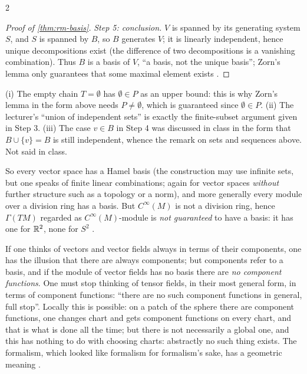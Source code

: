 \begin{paracol}{2}
\begin{proof}[Proof of \cref{thm:rm-basis}]
\emph{Step 5: conclusion.} $V$ is spanned by its generating system $S$, and $S$ is spanned by $B$, so $B$ generates $V$; it is linearly independent, hence unique decompositions exist (the difference of two decompositions is a vanishing combination). Thus $B$ is a basis of $V$, ``a basis, not the unique basis''; Zorn's lemma only guarantees that some maximal element exists
  .
\end{proof}
\begin{coursenote}
(i) The empty chain $T=\emptyset$ has $\emptyset\in P$ as an upper bound: this is why Zorn's lemma in the form above needs $P\ne\emptyset$, which is guaranteed since $\emptyset\in P$. (ii) The lecturer's ``union of independent sets'' is exactly the finite-subset argument given in Step 3. (iii) The case $v\in B$ in Step 4 was discussed in class in
the form that $B\cup\{v\}=B$ is still independent, whence the remark on sets and sequences above. Not said in class. 
\end{coursenote}
So every vector space has a Hamel basis (the construction may use infinite sets, but one speaks of finite linear combinations; again for vector spaces \emph{without} further structure such as a topology or a norm), and more generally every module over a division ring has a basis. But $C^\infty(M)$ is not a division ring, hence $\Gamma(TM)$ regarded as $C^\infty(M)$-module is
\emph{not guaranteed} to have a basis: it has one for $\mathbb{R}^2$, none for $S^2$     .

\begin{intuition}\label{int:rm-nocomp}
If one thinks of vectors and vector fields always in terms of their components, one has the illusion that there are always components; but components refer to a basis, and if the module of vector fields has no basis there are \emph{no component functions}. One must stop thinking of tensor fields, in their most general form, in terms of component functions: ``there
are no such component functions in general, full stop''. Locally this is possible: on a patch of the sphere there are component functions, one changes chart and gets component functions on every chart, and that is what is done all the time; but there is not necessarily a global one, and this has nothing to do with choosing charts: abstractly no such thing exists. The formalism, which looked like formalism for
formalism's sake, has a geometric meaning    .
\end{intuition}


\end{paracol}
